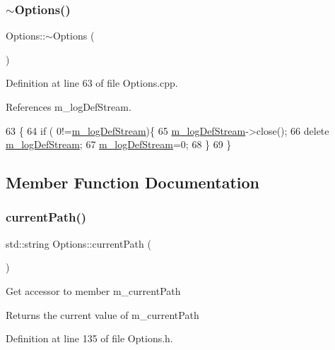 \subsubsection{\texorpdfstring{$\sim$\+Options()}{~Options()}}
{\footnotesize\ttfamily Options\+::$\sim$\+Options (\begin{DoxyParamCaption}{ }\end{DoxyParamCaption})}



Definition at line 63 of file Options.\+cpp.



References m\+\_\+log\+Def\+Stream.


\begin{DoxyCode}
63                   \{
64   \textcolor{keywordflow}{if} ( 0!=\hyperlink{classOptions_aebb2db3fb07ea1f73b27bde841be69d8}{m\_logDefStream})\{
65     \hyperlink{classOptions_aebb2db3fb07ea1f73b27bde841be69d8}{m\_logDefStream}->close();
66     \textcolor{keyword}{delete} \hyperlink{classOptions_aebb2db3fb07ea1f73b27bde841be69d8}{m\_logDefStream};
67     \hyperlink{classOptions_aebb2db3fb07ea1f73b27bde841be69d8}{m\_logDefStream}=0;
68   \}
69 \}
\end{DoxyCode}


\subsection{Member Function Documentation}
\mbox{\label{classOptions_ab9cf7442a712fe8593f6cf5cfff36a5d}} 
\subsubsection{\texorpdfstring{current\+Path()}{currentPath()}}
{\footnotesize\ttfamily std\+::string Options\+::current\+Path (\begin{DoxyParamCaption}{ }\end{DoxyParamCaption})\hspace{0.3cm}{\ttfamily [inline]}}

Get accessor to member m\+\_\+current\+Path \begin{DoxyReturn}{Returns}
the current value of m\+\_\+current\+Path 
\end{DoxyReturn}


Definition at line 135 of file Options.\+h.



